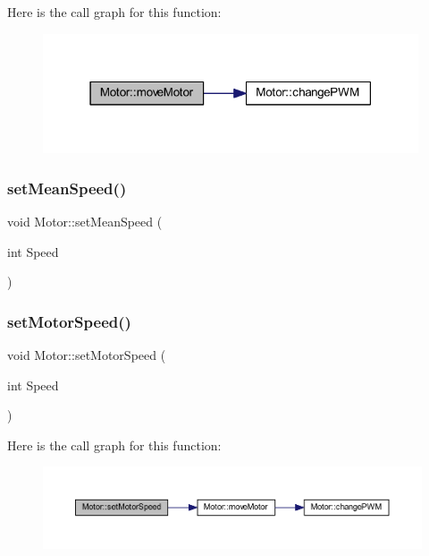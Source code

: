 Here is the call graph for this function\+:\nopagebreak
\begin{figure}[H]
\begin{center}
\leavevmode
\includegraphics[width=315pt]{class_motor_a06b855952ba7034f260063b6d94c4b3a_cgraph}
\end{center}
\end{figure}
\mbox{\label{class_motor_a468d680ba9e35742dacbb05028944cb3}} 
\subsubsection{\texorpdfstring{set\+Mean\+Speed()}{setMeanSpeed()}}
{\footnotesize\ttfamily void Motor\+::set\+Mean\+Speed (\begin{DoxyParamCaption}\item[{int}]{Speed }\end{DoxyParamCaption})}

\mbox{\label{class_motor_a72a29fd8773b5bfea30afc063d879072}} 
\subsubsection{\texorpdfstring{set\+Motor\+Speed()}{setMotorSpeed()}\hspace{0.1cm}{\footnotesize\ttfamily [1/2]}}
{\footnotesize\ttfamily void Motor\+::set\+Motor\+Speed (\begin{DoxyParamCaption}\item[{int}]{Speed }\end{DoxyParamCaption})}

Here is the call graph for this function\+:\nopagebreak
\begin{figure}[H]
\begin{center}
\leavevmode
\includegraphics[width=350pt]{class_motor_a72a29fd8773b5bfea30afc063d879072_cgraph}
\end{center}
\end{figure}
\mbox{\label{class_motor_af6e0f394e5d028bdd8cf9ce5e0fed919}} 
